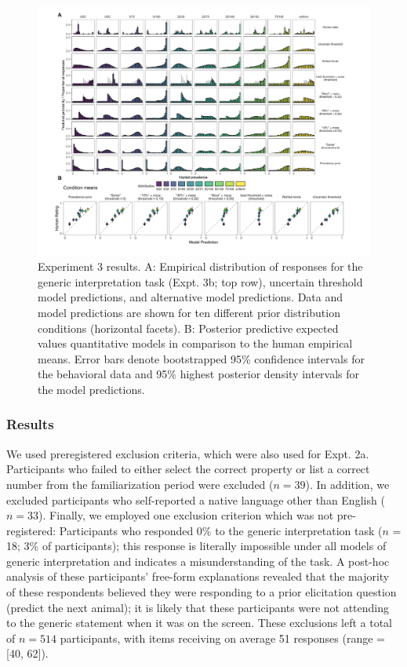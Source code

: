 \documentclass[floatsintext,doc]{apa6}
\begin{document}
\begin{figure}
\centering
\includegraphics{figs/expt2_model-results_nozero2.pdf}
\caption{\label{fig:genint-modelingResults2}Experiment 3 results. A: Empirical distribution of responses for the generic interpretation task (Expt. 3b; top row), uncertain threshold model predictions, and alternative model predictions. Data and model predictions are shown for ten different prior distribution conditions (horizontal facets). B: Posterior predictive expected values quantitative models in comparison to the human empirical means. Error bars denote bootstrapped 95\% confidence intervals for the behavioral data and 95\% highest posterior density intervals for the model predictions.}
\end{figure}



\hypertarget{results-2}{%
\subsubsection{Results}\label{results-2}}

We used preregistered exclusion criteria, which were also used for Expt. 2a.
Participants who failed to either select the correct property or list a correct number from the familiarization period were excluded (\(n = 39\)).
In addition, we excluded participants who self-reported a native language other than English (\(n = 33\)).
Finally, we employed one exclusion criterion which was not pre-registered: Participants who responded 0\% to the generic interpretation task ($n$ = 18; 3\% of participants); this response is literally impossible under all models of generic interpretation and indicates a misunderstanding of the task. 
A post-hoc analysis of these participants' free-form explanations revealed that the majority of these respondents believed they were responding to a prior elicitation question (predict the next animal); it is likely that these participants were not attending to the generic statement when it was on the screen.
These exclusions left a total of \(n = 514\) participants, with items receiving on average 51 responses (range = {[}40, 62{]}).
\end{document}

